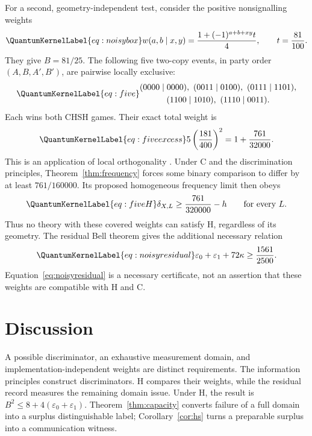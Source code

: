 \documentclass[a4paper,11pt,twocolumn,unpublished]{quantumarticle}
\let\label\QuantumKernelLabel
\newcommand{\eps}{\varepsilon}
\begin{document}
For a second, geometry-independent test, consider the positive nonsignalling weights
\begin{equation}\label{eq:noisybox}
 w(a,b\mid x,y)=\frac{1+(-1)^{a+b+xy}t}{4},\qquad t=\frac{81}{100}.
\end{equation}
They give $B=81/25$. The following five two-copy events, in party order $(A,B,A',B')$, are pairwise locally exclusive:
\begin{equation}\label{eq:five}
\begin{gathered}
 (0000\mid0000),\ (0011\mid0100),\ (0111\mid1101),\\
 (1100\mid1010),\ (1110\mid0011).
\end{gathered}
\end{equation}
Each wins both CHSH games. Their exact total weight is
\begin{equation}\label{eq:fiveexcess}
 5\left(\frac{181}{400}\right)^2=1+\frac{761}{32000}.
\end{equation}
This is an application of local orthogonality \cite{lo}. Under C and the discrimination principles, Theorem~\ref{thm:frequency} forces some binary comparison to differ by at least $761/160000$. Its proposed homogeneous frequency limit then obeys
\begin{equation}\label{eq:fiveH}
 \delta_{X,L}\geq\frac{761}{320000}-h\qquad\text{for every }L.
\end{equation}
Thus no theory with these covered weights can satisfy H, regardless of its geometry. The residual Bell theorem gives the additional necessary relation
\begin{equation}\label{eq:noisyresidual}
 \eps_0+\eps_1+72\kappa\geq\frac{1561}{2500}.
\end{equation}
Equation~\eqref{eq:noisyresidual} is a necessary certificate, not an assertion that these weights are compatible with H and C.

\section{Discussion}
A possible discriminator, an exhaustive measurement domain, and implementation-independent weights are distinct requirements. The information principles construct discriminators. H compares their weights, while the residual record measures the remaining domain issue. Under H, the result is $B^2\leq8+4(\eps_0+\eps_1)$. Theorem~\ref{thm:capacity} converts failure of a full domain into a surplus distinguishable label; Corollary~\ref{cor:hs} turns a preparable surplus into a communication witness.
\end{document}
